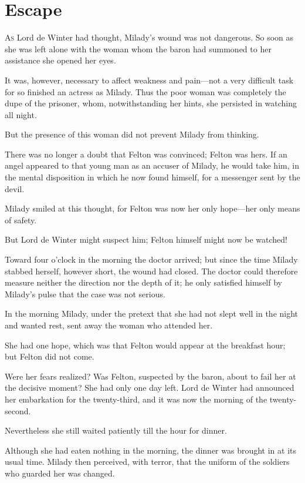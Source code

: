 
\chapter{Escape}

\lettrine{A}{s} Lord de Winter had thought, Milady's wound was not dangerous. So soon as she was left alone with the woman whom the baron had summoned to her assistance she opened her eyes. 

\zz
It was, however, necessary to affect weakness and pain—not a very difficult task for so finished an actress as Milady. Thus the poor woman was completely the dupe of the prisoner, whom, notwithstanding her hints, she persisted in watching all night. 

But the presence of this woman did not prevent Milady from thinking. 

There was no longer a doubt that Felton was convinced; Felton was hers. If an angel appeared to that young man as an accuser of Milady, he would take him, in the mental disposition in which he now found himself, for a messenger sent by the devil. 

Milady smiled at this thought, for Felton was now her only hope—her only means of safety. 

But Lord de Winter might suspect him; Felton himself might now be watched! 

Toward four o'clock in the morning the doctor arrived; but since the time Milady stabbed herself, however short, the wound had closed. The doctor could therefore measure neither the direction nor the depth of it; he only satisfied himself by Milady's pulse that the case was not serious. 

In the morning Milady, under the pretext that she had not slept well in the night and wanted rest, sent away the woman who attended her. 

She had one hope, which was that Felton would appear at the breakfast hour; but Felton did not come. 

Were her fears realized? Was Felton, suspected by the baron, about to fail her at the decisive moment? She had only one day left. Lord de Winter had announced her embarkation for the twenty-third, and it was now the morning of the twenty-second. 

Nevertheless she still waited patiently till the hour for dinner. 

Although she had eaten nothing in the morning, the dinner was brought in at its usual time. Milady then perceived, with terror, that the uniform of the soldiers who guarded her was changed. 

